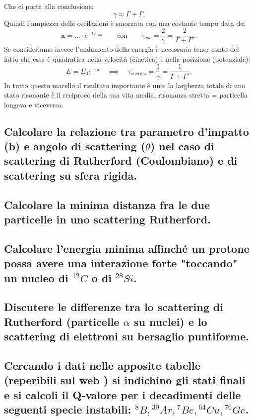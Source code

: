 Che ci porta alla conclusione:
\[
\gamma \approx \Gamma + \Gamma 
.\]
Quindi l'ampiezza delle oscilazioni è smorzata con una costante tempo data da:
\[
	\boldsymbol{x} = \ldots \cdot e^{- t /\tau_{\text{osc}}} \quad \quad \text{con} \quad \quad
\tau_{osc} = \frac{2}{\gamma} = \frac{2}{\Gamma + \Gamma'}
.\]
Se consideriamo invece l'andamento della energia è necessario tener conto del fatto che essa è quadratica nella velocità (cinetica) e nella posizione (potenziale): 
\[
E = E_0 e^{- \gamma t} \quad \implies \quad \tau_{\text{energia}} = \frac{1}{\gamma} = \frac{1}{\Gamma + \Gamma'}
.\]
In tutto questo macello il risultato importante è uno: la larghezza totale di uno stato risonante è il reciproco della sua vita media, risonanza stretta = particella longeva e viceversa.

\subsection[]{Calcolare la relazione tra parametro d'impatto (b) e angolo di scattering ($\theta$) nel caso di scattering di Rutherford (Coulombiano) e di scattering su sfera rigida.} 


\subsection[]{ Calcolare la minima distanza fra le due particelle in uno scattering Rutherford.}

\subsection[]{ Calcolare l'energia minima affinché un protone possa avere una interazione forte "toccando" un nucleo di ${}^{12}C$ o di ${}^{28} Si$.}

\subsection[]{ Discutere le differenze tra lo scattering di Rutherford (particelle $\alpha$ su nuclei) e lo scattering di elettroni su bersaglio puntiforme.}

\subsection[]{ Cercando i dati nelle apposite tabelle (reperibili sul web ) si indichino gli stati finali e si calcoli il Q-valore per i decadimenti delle seguenti specie instabili: ${}^8B, {}^{39}Ar, {}^{7}Be, {}^{64}Cu, {}^{76}Ge$. }


